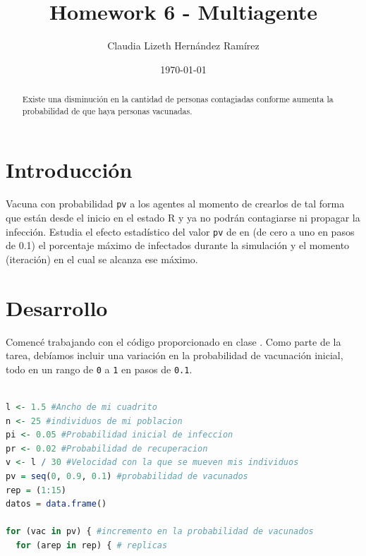 \documentclass{article}
\author{Claudia Lizeth Hern\'andez Ram\'irez} %
\title{Homework 6 - Multiagente} %
\date{\today}
\begin{document}

\maketitle %

\begin{abstract} %
  \centering
Existe una disminuci\'on en la cantidad de personas contagiadas conforme aumenta la probabilidad de que haya personas vacunadas.
  
\end{abstract}


\section{Introducci\'{o}n}\label{intro} %
Vacuna con probabilidad \texttt{pv} a los agentes al momento de crearlos de tal forma que están desde el inicio en el estado R y ya no podrán contagiarse ni propagar la infección. Estudia el efecto estadístico del valor \texttt{pv} de  en (de cero a uno en pasos de 0.1) el porcentaje máximo de infectados durante la simulación y el momento (iteración) en el cual se alcanza ese máximo.



\section{Desarrollo}\label{desarrollo} %

Comenc\'e trabajando con el c\'odigo proporcionado en clase \cite{Cbase}. Como parte de la tarea, deb\'iamos incluir una variaci\'on en la probabilidad de vacunaci\'on inicial, todo en un rango de \texttt{0} a \texttt{1} en pasos de \texttt{0.1}.

\begin{lstlisting}[language=R, caption= Segmento de c\'odigo para variar probabilidad de vacuna inicial.]

l <- 1.5 #Ancho de mi cuadrito
n <- 25 #individuos de mi poblacion
pi <- 0.05 #Probabilidad inicial de infeccion
pr <- 0.02 #Probabilidad de recuperacion
v <- l / 30 #Velocidad con la que se mueven mis individuos
pv = seq(0, 0.9, 0.1) #probabilidad de vacunados
rep = (1:15)
datos = data.frame()

for (vac in pv) { #incremento en la probabilidad de vacunados
  for (arep in rep) { # replicas
\end{lstlisting}
\end{document}
